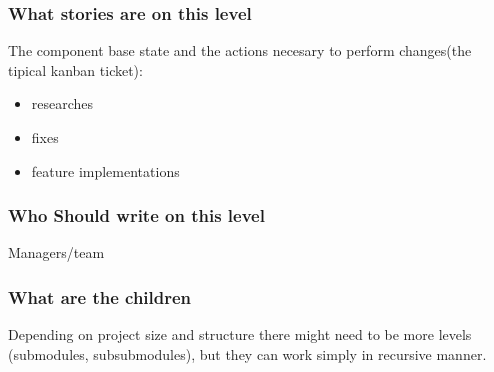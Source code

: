 \subsubsection{What stories are on this level}
The component base state and the actions necesary to perform changes(the tipical kanban ticket):
\begin{itemize}
    \item researches
    \item fixes
    \item feature implementations
\end{itemize} 
\subsubsection{Who Should write on this level}
Managers/team
\subsubsection{What are the children}
Depending on project size and structure there might need to be more levels (submodules, subsubmodules), but they can work simply in recursive manner.



\newpage

